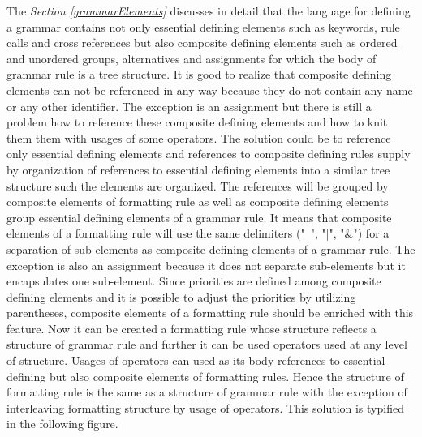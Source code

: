 \documentclass[12pt,notitlepage,a4paper]{report}
\begin{document}
The \textit{Section \ref{grammarElements}} discusses in detail that the language for defining a grammar contains not only essential defining elements such as  keywords, rule calls and cross references but also composite defining elements such as ordered and unordered groups, alternatives and assignments for which the body of grammar rule is a tree structure. It is good to realize that composite defining elements can not be referenced in any way because they do not contain any name or any other identifier. The exception is an assignment but there is still a problem how to reference these composite defining elements and how to knit them them with usages of some operators. The solution could be to reference only essential defining elements and references to composite defining rules supply by organization of references to essential defining elements into a similar tree structure such the elements are organized. The references will be grouped by composite elements of formatting rule as well as composite defining elements group essential defining elements of a grammar rule. It means that composite elements of a formatting rule will use the same delimiters ("~", "\big|", "\&") for a separation of sub-elements as composite defining elements of a grammar rule. The exception is also an assignment because it does not separate sub-elements but it encapsulates one sub-element. Since priorities are defined among composite defining elements and it is possible to adjust the priorities by utilizing parentheses,  composite elements of a formatting  rule should be enriched with this feature. Now it can be created a formatting rule whose structure reflects a structure of grammar rule and further it can be used operators used at any level of structure. Usages of operators can used as its body references to essential defining but also composite elements of formatting rules. Hence the structure of formatting rule is the same as a structure of grammar rule with the exception of interleaving formatting structure by usage of operators. This solution is typified in the following figure.
\end{document}

